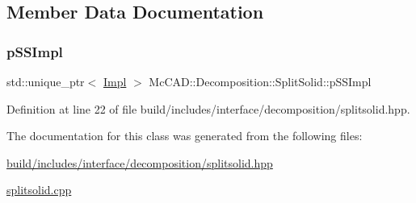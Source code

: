 \subsection{Member Data Documentation}
\mbox{\label{classMcCAD_1_1Decomposition_1_1SplitSolid_a9ae605a91ed830bea7ad866d758743ab}} 
\subsubsection{\texorpdfstring{p\+S\+S\+Impl}{pSSImpl}}
{\footnotesize\ttfamily std\+::unique\+\_\+ptr$<$ \hyperlink{classMcCAD_1_1Decomposition_1_1SplitSolid_1_1Impl}{Impl} $>$ Mc\+C\+A\+D\+::\+Decomposition\+::\+Split\+Solid\+::p\+S\+S\+Impl\hspace{0.3cm}{\ttfamily [private]}}



Definition at line 22 of file build/includes/interface/decomposition/splitsolid.\+hpp.



The documentation for this class was generated from the following files\+:\begin{DoxyCompactItemize}
\item 
\hyperlink{build_2includes_2interface_2decomposition_2splitsolid_8hpp}{build/includes/interface/decomposition/splitsolid.\+hpp}\item 
\hyperlink{splitsolid_8cpp}{splitsolid.\+cpp}\end{DoxyCompactItemize}
